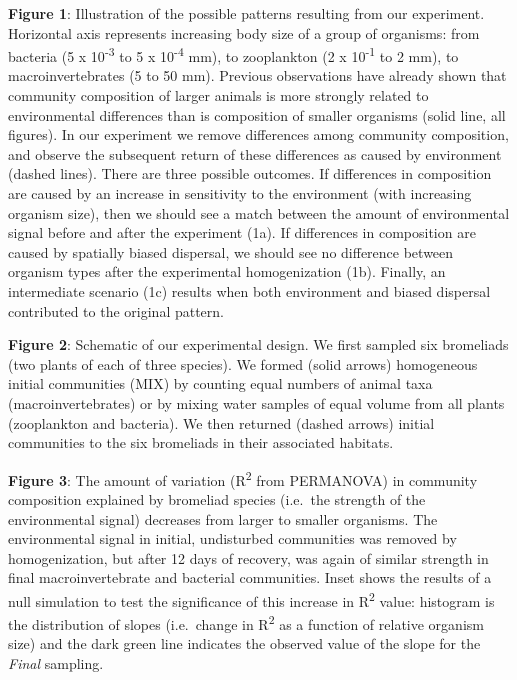 \documentclass[12pt,]{article}
\begin{document}
\textbf{Figure 1}: Illustration of the possible patterns resulting from
our experiment. Horizontal axis represents increasing body size of a
group of organisms: from bacteria (5 x 10\textsuperscript{-3} to 5 x
10\textsuperscript{-4} mm), to zooplankton (2 x 10\textsuperscript{-1}
to 2 mm), to macroinvertebrates (5 to 50 mm). Previous observations have
already shown that community composition of larger animals is more
strongly related to environmental differences than is composition of
smaller organisms (solid line, all figures). In our experiment we remove
differences among community composition, and observe the subsequent
return of these differences as caused by environment (dashed lines).
There are three possible outcomes. If differences in composition are
caused by an increase in sensitivity to the environment (with increasing
organism size), then we should see a match between the amount of
environmental signal before and after the experiment (1a). If
differences in composition are caused by spatially biased dispersal, we
should see no difference between organism types after the experimental
homogenization (1b). Finally, an intermediate scenario (1c) results when
both environment and biased dispersal contributed to the original
pattern.

\textbf{Figure 2}: Schematic of our experimental design. We first
sampled six bromeliads (two plants of each of three species). We formed
(solid arrows) homogeneous initial communities (MIX) by counting equal
numbers of animal taxa (macroinvertebrates) or by mixing water samples
of equal volume from all plants (zooplankton and bacteria). We then
returned (dashed arrows) initial communities to the six bromeliads in
their associated habitats.

\textbf{Figure 3}: The amount of variation (R\textsuperscript{2} from
PERMANOVA) in community composition explained by bromeliad species
(i.e.~the strength of the environmental signal) decreases from larger to
smaller organisms. The environmental signal in initial, undisturbed
communities was removed by homogenization, but after 12 days of
recovery, was again of similar strength in final macroinvertebrate and
bacterial communities. Inset shows the results of a null simulation to
test the significance of this increase in R\textsuperscript{2} value:
histogram is the distribution of slopes (i.e.~change in
R\textsuperscript{2} as a function of relative organism size) and the
dark green line indicates the observed value of the slope for the
\emph{Final} sampling.

\newpage
\end{document}
